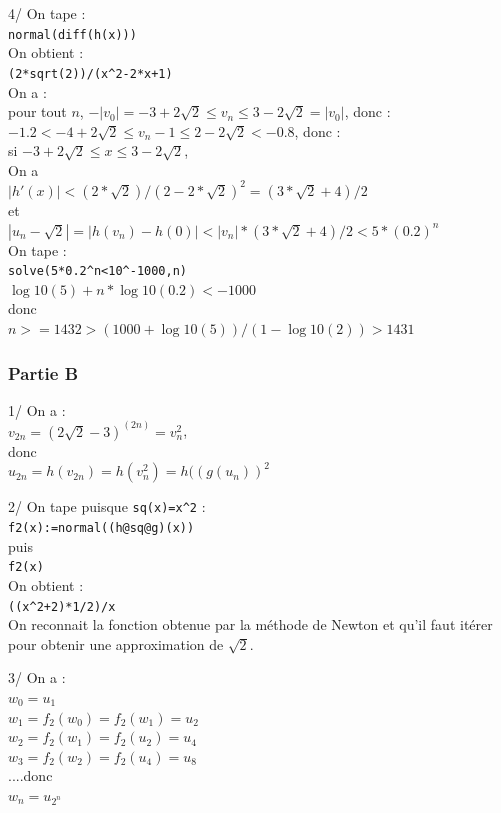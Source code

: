 \documentclass[a4paper,11pt]{book}
\begin{document}
4/ On tape :\\
{\tt normal(diff(h(x)))}\\
On obtient :\\
{\tt (2*sqrt(2))/(x\verb|^|2-2*x+1)}\\
On a :\\
pour tout $n$, $-|v_0|=-3+2\sqrt 2 \leq v_n \leq 3-2\sqrt 2=|v_0|$, donc :\\
$-1.2<-4+2 \sqrt 2 \leq v_n-1 \leq 2-2 \sqrt 2<-0.8$, donc :\\
si $-3+2 \sqrt 2 \leq x \leq 3-2\sqrt 2$, \\
On a\\
$|h'(x)|<(2*\sqrt 2)/(2-2*\sqrt 2)^2=(3*\sqrt 2+4)/2$\\
 et\\
$|u_n-\sqrt 2|=|h(v_n)-h(0)|<|v_n|*(3*\sqrt 2+4)/2 <5* (0.2)^n$\\
On tape :\\
{\tt solve(5*0.2\verb|^|n<10\verb|^|-1000,n)}\\
$\log10(5)+n*\log10(0.2)<-1000$\\
donc\\
$n>=1432>(1000+\log10(5))/(1-\log10(2))>1431$
\subsubsection{Partie B}
1/ On a :\\
$v_{2n}=(2\sqrt 2-3)^(2n)=v_n^2$,\\
donc \\
$u_{2n}=h(v_{2n})=h(v_n^2)=h((g(u_n))^2$ 

2/ On tape puisque {\tt sq(x)=x\verb|^|2} :\\
{\tt f2(x):=normal((h@sq@g)(x))}\\
puis \\
{\tt f2(x)}\\
On obtient :\\
 {\tt ((x\verb|^|2+2)*1/2)/x}\\
On reconnait la fonction obtenue par la m\'ethode de Newton et
qu'il faut  it\'erer pour obtenir une approximation de $\sqrt 2$.

3/ On a :\\
$w_0=u_1$\\
$w_1=f_2(w_0)=f_2(w_1)=u_2$\\
$w_2=f_2(w_1)=f_2(u_2)=u_4$\\
$w_3=f_2(w_2)=f_2(u_4)=u_8$\\
....donc \\
$w_n=u_{2^n}$
\end{document}
